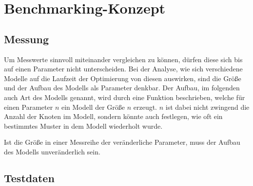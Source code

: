 \chapter{Benchmarking-Konzept}
\section{Messung} %
\label{sec:Messung}
Um Messwerte sinnvoll miteinander vergleichen zu können, dürfen diese sich bis
auf einen Parameter nicht unterscheiden. Bei der Analyse, wie sich verschiedene
Modelle auf die Laufzeit der Optimierung von diesen auswirken, sind die Größe
und der Aufbau des Modells als Parameter denkbar. Der Aufbau, im folgenden auch
Art des Modells genannt, wird durch eine Funktion beschrieben, welche für einen
Parameter $n$ ein Modell der Größe $n$ erzeugt. $n$ ist dabei nicht zwingend
die Anzahl der Knoten im Modell, sondern könnte auch festlegen, wie
oft ein bestimmtes Muster in dem Modell wiederholt wurde.

Ist die Größe in einer Messreihe der veränderliche Parameter, muss der Aufbau
des Modells unveränderlich sein.
\section{Testdaten} %
\label{sec:Testdaten}

